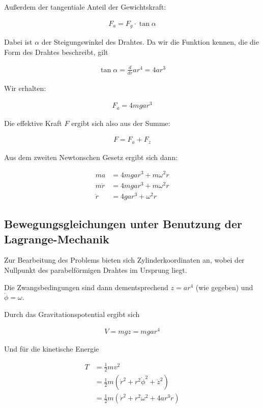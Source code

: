 \documentclass[a4paper,german,12pt,smallheadings]{scrartcl}
\begin{document}
Außerdem der tangentiale Anteil der Gewichtskraft:

\begin{align*}
  F_a = F_g \cdot \tan \alpha
\end{align*}

Dabei ist $\alpha$ der Steigungswinkel des Drahtes. Da wir die Funktion kennen,
die die Form des Drahtes beschreibt, gilt

\begin{align*}
  \tan \alpha = \frac{d}{dr} ar^4 = 4ar^3
\end{align*}

Wir erhalten:

\begin{align*}
  F_a = 4mgar^3
\end{align*}

Die effektive Kraft $F$ ergibt sich also aus der Summe:

\begin{align*}
  F = F_a + F_z
\end{align*}

Aus dem zweiten Newtonschen Gesetz ergibt sich dann:

\begin{align*}
  ma &= 4mgar^3 + m \omega^2 r \\
  m\ddot{r} &= 4mgar^3 + m \omega^2 r \\
  \ddot{r} &= 4gar^3 + \omega^2 r
\end{align*}

\subsection*{Bewegungsgleichungen unter Benutzung der Lagrange-Mechanik}

Zur Bearbeitung des Problems bieten sich Zylinderkoordinaten an, wobei der
Nullpunkt des parabelförmigen Drahtes im Ursprung liegt.

Die Zwangsbedingungen sind dann dementsprechend $z=ar^4$ (wie gegeben) und
$\dot{\phi} = \omega$.

Durch das Gravitationspotential ergibt sich

\begin{align*}
  V = mgz = mgar^4
\end{align*}

Und für die kinetische Energie

\begin{align*}
  T &= \frac{1}{2}mv^2 \\
    &= \frac{1}{2}m(\dot{r}^2 + r^2\dot{\phi}^2 + \dot{z}^2) \\
    &= \frac{1}{2}m(\dot{r}^2 + r^2\omega^2 + 4ar^3\dot{r})
\end{align*}
\end{document}
